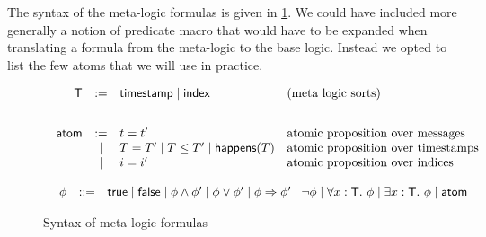 The syntax of the meta-logic formulas is given in \cref{fig:formulas}.
We could have included more generally a notion of predicate macro that
would have to be expanded when translating a formula from the meta-logic
to the base logic. Instead we opted to list the few atoms that we
will use in practice.

\begin{figure}[h]
  \[
  \begin{array}{c}
   \begin{array}{rcll}
    \textsf{T} &  := & \textsf{timestamp} \mid \textsf{index} & \text{(meta logic sorts)} \\
    \\[2ex]
   \textsf{atom} & := & t=t'
 & \text{atomic proposition over messages } \\
  &\mid & T=T' \mid T \leq T' \mid \textsf{happens}(T) &  \text{atomic proposition
  over timestamps } \\
  &\mid & i=i'  &  \text{atomic proposition
    over indices } \\
    \end{array}
\\
\\
     \begin{array}{rcll}
    \phi & ::= &  \textsf{true} \mid \textsf{false} \mid \phi \wedge \phi' \mid  \phi
    \vee \phi' \mid   \phi \Rightarrow \phi'\mid \neg \phi \mid
    \forall x : \textsf{T}.\ \phi \mid \exists x:\textsf{T}.\ \phi \mid \textsf{atom} &
    \end{array}

\end{array}
    \]
    \caption{Syntax of meta-logic formulas}\label{fig:formulas}
\end{figure}
